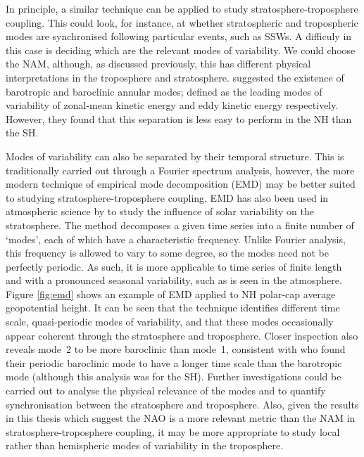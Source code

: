 In principle, a similar technique can be applied to study
stratosphere-troposphere coupling. This could look, for instance, at whether
stratospheric and tropospheric modes are synchronised following particular
events, such as SSWs. A difficuly in this case is deciding which are the
relevant modes of variability. We could choose the NAM, although, as discussed
previously, this has different physical interpretations in the troposphere and
stratosphere. \citet{Thompson2014} suggested the existence of barotropic and
baroclinic annular modes; defined as the leading modes of variability of
zonal-mean kinetic energy and eddy kinetic energy respectively. However, they
found that this separation is less easy to perform in the NH than the SH.

Modes of variability can also be separated by their temporal structure. This is
traditionally carried out through a Fourier spectrum analysis, however, the more
modern technique of empirical mode decomposition (EMD) \citep{Huang1998} may be
better suited to studying stratosphere-troposphere coupling. EMD has also been
used in atmospheric science by \citet{Coughlin2004} to study the influence of
solar variability on the stratosphere. The method decomposes a given time series
into a finite number of `modes', each of which have a characteristic
frequency. Unlike Fourier analysis, this frequency is allowed to vary to some
degree, so the modes need not be perfectly periodic. As such, it is more
applicable to time series of finite length and with a pronounced seasonal
variability, such as is seen in the atmosphere. Figure \ref{fig:emd} shows an
example of EMD applied to NH polar-cap average geopotential height. It can be
seen that the technique identifies different time scale, quasi-periodic modes of
variability, and that these modes occasionally appear coherent through the
stratosphere and troposphere. Closer inspection also reveals mode~2 to be more
baroclinic than mode~1, consistent with \citet{Thompson2014} who found their
periodic baroclinic mode to have a longer time scale than the barotropic mode
(although this analysis was for the SH). Further investigations could be carried
out to analyse the physical relevance of the modes and to quantify
synchronisation between the stratosphere and troposphere. Also, given the
results in this thesis which suggest the NAO is a more relevant metric than the
NAM in stratosphere-troposphere coupling, it may be more appropriate to study
local rather than hemispheric modes of variability in the troposphere.

